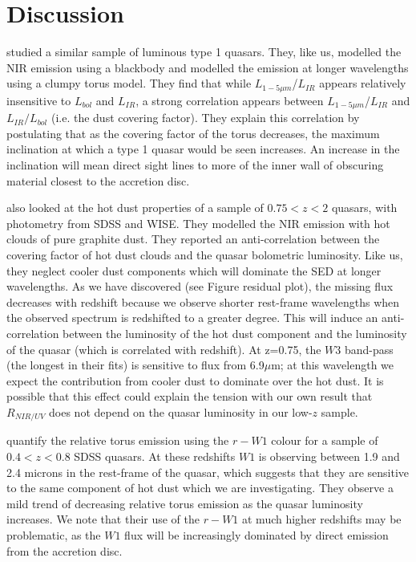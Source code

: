 \section{Discussion}

\citet{roseboom13} studied a similar sample of luminous type 1 quasars. 
They, like us, modelled the \ac{NIR} emission using a blackbody and modelled the emission at longer wavelengths using a clumpy torus model. 
They find that while $L_{1-5\mu m}$/$L_{IR}$ appears relatively insensitive to $L_{bol}$ and $L_{IR}$, a strong correlation appears between $L_{1-5\mu m}$/$L_{IR}$ and $L_{IR}/L_{bol}$ (i.e. the dust covering factor). 
They explain this correlation by postulating that as the covering factor of the torus decreases, the maximum inclination at which a type 1 quasar would be seen increases. 
An increase in the inclination will mean direct sight lines to more of the inner wall of obscuring material closest to the accretion disc.

\citet{mor11} also looked at the hot dust properties of a sample of $0.75 < z < 2$ quasars, with photometry from SDSS and WISE. 
They modelled the \ac{NIR} emission with hot clouds of pure graphite dust. 
They reported an anti-correlation between the covering factor of hot dust clouds and the quasar bolometric luminosity. 
Like us, they neglect cooler dust components which will dominate the \ac{SED} at longer wavelengths. 
As we have discovered (see Figure residual plot), the missing flux decreases with redshift because we observe shorter rest-frame wavelengths when the observed spectrum is redshifted to a greater degree. 
This will induce an anti-correlation between the luminosity of the hot dust component and the luminosity of the quasar (which is correlated with redshift). 
At z=0.75, the $W3$ band-pass (the longest in their fits) is sensitive to flux from 6.9$\mu$m; at this wavelength we expect the contribution from cooler dust to dominate over the hot dust. 
It is possible that this effect could explain the tension with our own result that $R_{NIR/UV}$ does not depend on the quasar luminosity in our low-$z$ sample. 

\citet{shen14} quantify the relative torus emission using the $r-W1$ colour for a sample of $0.4 < z < 0.8$ SDSS quasars. 
At these redshifts $W1$ is observing between 1.9 and 2.4 microns in the rest-frame of the quasar, which suggests that they are sensitive to the same component of hot dust which we are investigating. 
They observe a mild trend of decreasing relative torus emission as the quasar luminosity increases. 
We note that their use of the $r-W1$ at much higher redshifts may be problematic, as the $W1$ flux will be increasingly dominated by direct emission from the accretion disc. 

